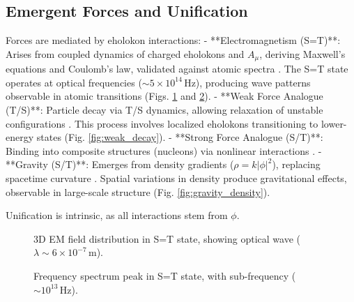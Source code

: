 \documentclass[11pt]{article}
\begin{document}
\subsection{Emergent Forces and Unification}
Forces are mediated by eholokon interactions:
- **Electromagnetism (S=T)**: Arises from coupled dynamics of charged eholokons and \(A_\mu\), deriving Maxwell’s equations and Coulomb’s law, validated against atomic spectra \citep{emvula2025atomic}. The S=T state operates at optical frequencies (\(\sim 5 \times 10^{14} \, \text{Hz}\)), producing wave patterns observable in atomic transitions (Figs. \ref{fig:em_field} and \ref{fig:em_freq}).
- **Weak Force Analogue (T/S)**: Particle decay via T/S dynamics, allowing relaxation of unstable configurations \citep{emvula2025particles}. This process involves localized eholokons transitioning to lower-energy states (Fig. \ref{fig:weak_decay}).
- **Strong Force Analogue (S/T)**: Binding into composite structures (nucleons) via nonlinear interactions \citep{emvula2025particles}.
- **Gravity (S/T)**: Emerges from density gradients (\(\rho = k |\phi|^2\)), replacing spacetime curvature \citep{emvula2025gravity}. Spatial variations in density produce gravitational effects, observable in large-scale structure (Fig. \ref{fig:gravity_density}).

Unification is intrinsic, as all interactions stem from \(\phi\).

\begin{figure}[htbp]
\centering
{}
\caption{3D EM field distribution in S=T state, showing optical wave (\(\lambda \sim 6 \times 10^{-7} \, \text{m}\)).}
\label{fig:em_field}
\end{figure}

\begin{figure}[htbp]
\centering
{}
\caption{Frequency spectrum peak in S=T state, with sub-frequency (\(\sim 10^{13} \, \text{Hz}\)).}
\label{fig:em_freq}
\end{figure}
\end{document}
